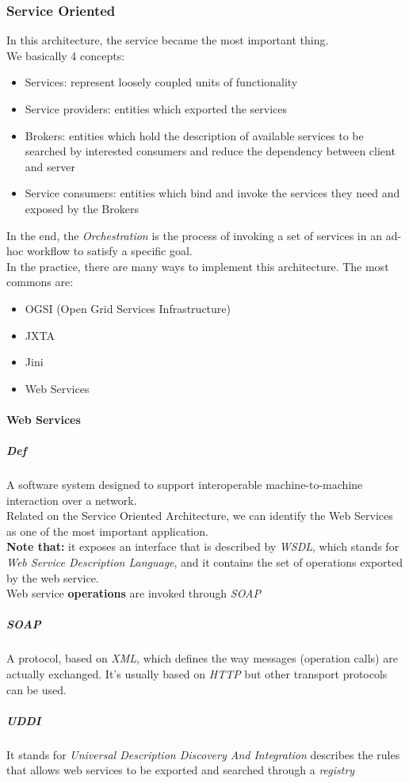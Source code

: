     \subsubsection{Service Oriented}
    In this architecture, the service became the most important thing.\\
    We basically 4 concepts:
    \begin{itemize}
        \item Services: represent loosely coupled units of functionality
        \item Service providers: entities which exported the services
        \item Brokers: entities which hold the description of available 
                services to be searched by interested consumers and reduce the
                dependency between client and server
        \item Service consumers: entities which bind and invoke the services
                they need and exposed by the Brokers
    \end{itemize}
    In the end, the \textit{Orchestration} is the process of invoking a set
    of services in an ad-hoc workflow to satisfy a specific goal.\\
    In the practice, there are many ways to implement this architecture.
    The most commons are:
    \begin{itemize}
        \item OGSI (Open Grid Services Infrastructure)
        \item JXTA
        \item Jini
        \item Web Services
    \end{itemize}
    
    \paragraph{Web Services}
    \subparagraph{Def}
    A software system designed to support interoperable machine-to-machine
    interaction over a network.\\
    Related on the Service Oriented Architecture, we can identify
    the Web Services as one of the most important application.\\
    \textbf{Note that:} it exposes an interface that is described by \textit{WSDL},
    which stands for \textit{Web Service Description Language}, and it
    contains the set of operations exported by the web service.\\
    Web service \textbf{operations} are invoked through \textit{SOAP}
    \subparagraph{SOAP}
    A protocol, based on \textit{XML}, which defines the way messages
    (operation calls) are actually exchanged. It's usually based on \textit{HTTP}
    but other transport protocols can be used.
    \subparagraph{UDDI}
    It stands for \textit{Universal Description Discovery And Integration}
    describes the rules that allows web services to be exported and searched
    through a \textit{registry}

